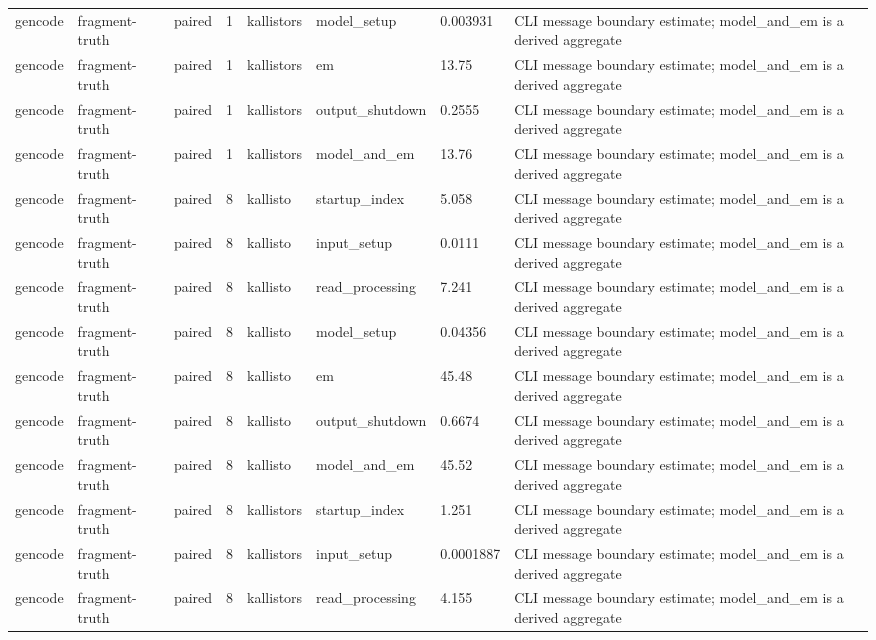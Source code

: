 \begin{tabular}{llllllll}
gencode & fragment-truth & paired & 1 & kallistors & model\_setup & 0.003931 & CLI message boundary estimate; model\_and\_em is a derived aggregate \\
gencode & fragment-truth & paired & 1 & kallistors & em & 13.75 & CLI message boundary estimate; model\_and\_em is a derived aggregate \\
gencode & fragment-truth & paired & 1 & kallistors & output\_shutdown & 0.2555 & CLI message boundary estimate; model\_and\_em is a derived aggregate \\
gencode & fragment-truth & paired & 1 & kallistors & model\_and\_em & 13.76 & CLI message boundary estimate; model\_and\_em is a derived aggregate \\
gencode & fragment-truth & paired & 8 & kallisto & startup\_index & 5.058 & CLI message boundary estimate; model\_and\_em is a derived aggregate \\
gencode & fragment-truth & paired & 8 & kallisto & input\_setup & 0.0111 & CLI message boundary estimate; model\_and\_em is a derived aggregate \\
gencode & fragment-truth & paired & 8 & kallisto & read\_processing & 7.241 & CLI message boundary estimate; model\_and\_em is a derived aggregate \\
gencode & fragment-truth & paired & 8 & kallisto & model\_setup & 0.04356 & CLI message boundary estimate; model\_and\_em is a derived aggregate \\
gencode & fragment-truth & paired & 8 & kallisto & em & 45.48 & CLI message boundary estimate; model\_and\_em is a derived aggregate \\
gencode & fragment-truth & paired & 8 & kallisto & output\_shutdown & 0.6674 & CLI message boundary estimate; model\_and\_em is a derived aggregate \\
gencode & fragment-truth & paired & 8 & kallisto & model\_and\_em & 45.52 & CLI message boundary estimate; model\_and\_em is a derived aggregate \\
gencode & fragment-truth & paired & 8 & kallistors & startup\_index & 1.251 & CLI message boundary estimate; model\_and\_em is a derived aggregate \\
gencode & fragment-truth & paired & 8 & kallistors & input\_setup & 0.0001887 & CLI message boundary estimate; model\_and\_em is a derived aggregate \\
gencode & fragment-truth & paired & 8 & kallistors & read\_processing & 4.155 & CLI message boundary estimate; model\_and\_em is a derived aggregate \\

\end{tabular}
